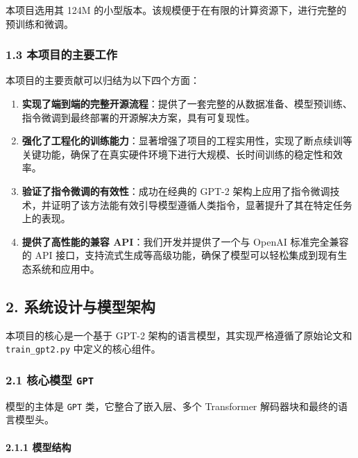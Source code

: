 \documentclass[a4paper]{article}
\providecommand{\tightlist}{%
  \setlength{\itemsep}{0pt}\setlength{\parskip}{0pt}}
\begin{document}
本项目选用其 124M
的小型版本。该规模便于在有限的计算资源下，进行完整的预训练和微调。

\subsubsection{1.3
本项目的主要工作}\label{ux672cux9879ux76eeux7684ux4e3bux8981ux5de5ux4f5c}

本项目的主要贡献可以归结为以下四个方面：

\begin{enumerate}
\def\labelenumi{\arabic{enumi}.}
\tightlist
\item
  \textbf{实现了端到端的完整开源流程}：提供了一套完整的从数据准备、模型预训练、指令微调到最终部署的开源解决方案，具有可复现性。
\item
  \textbf{强化了工程化的训练能力}：显著增强了项目的工程实用性，实现了断点续训等关键功能，确保了在真实硬件环境下进行大规模、长时间训练的稳定性和效率。
\item
  \textbf{验证了指令微调的有效性}：成功在经典的 GPT-2
  架构上应用了指令微调技术，并证明了该方法能有效引导模型遵循人类指令，显著提升了其在特定任务上的表现。
\item
  \textbf{提供了高性能的兼容 API}：我们开发并提供了一个与 OpenAI
  标准完全兼容的 API
  接口，支持流式生成等高级功能，确保了模型可以轻松集成到现有生态系统和应用中。
\end{enumerate}

\subsection{2.
系统设计与模型架构}\label{ux7cfbux7edfux8bbeux8ba1ux4e0eux6a21ux578bux67b6ux6784}

本项目的核心是一个基于 GPT-2 架构的语言模型，其实现严格遵循了原始论文和
\texttt{train\_gpt2.py} 中定义的核心组件。

\subsubsection{\texorpdfstring{2.1 核心模型
\texttt{GPT}}{2.1 核心模型 GPT}}\label{ux6838ux5fc3ux6a21ux578b-gpt}

模型的主体是 \texttt{GPT} 类，它整合了嵌入层、多个 Transformer
解码器块和最终的语言模型头。

\paragraph{2.1.1 模型结构}\label{ux6a21ux578bux7ed3ux6784}
\end{document}
